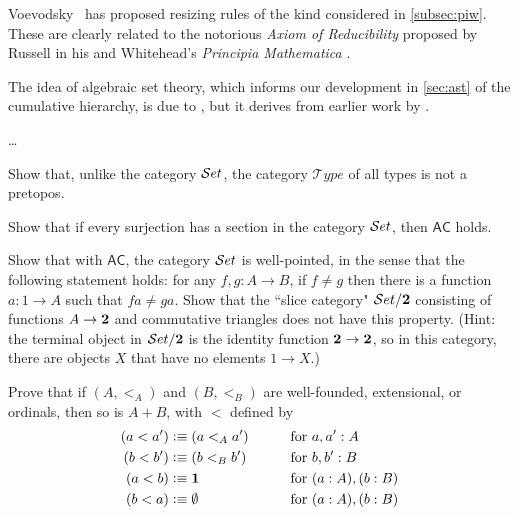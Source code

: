 Voevodsky~\cite{Universe-poly} has proposed resizing rules of the kind considered in \autoref{subsec:piw}.  These are clearly related to the notorious \emph{Axiom of Reducibility} proposed by Russell in his and Whitehead's \emph{Principia Mathematica} \cite{WR:PM}.

The idea of algebraic set theory, which informs our development in \autoref{sec:ast} of the cumulative hierarchy, is due to \cite{JoyalMoerdijk}, but it derives from earlier work by \cite{AczelCZF}.

\dots

\sectionExercises

\begin{ex}
  Show that, unlike  the category $\mathcal{S}et$, the category $\mathcal{T}ype$ of all types is not a pretopos.
  \end{ex}

\begin{ex}
  Show that if every surjection has a section in the category $\mathcal{S}et$, then $\mathsf{AC}$ holds.
\end{ex}

\begin{ex}
Show that with $\mathsf{AC}$, the category $\mathcal{S}et$ is well-pointed, in the sense that the following statement holds: for any $f, g : A\to B$, if $f \neq g$ then there is a function $a : 1\to A$ such that $fa \neq ga$.  Show that the ``slice category" $\mathcal{S}et/\mathbf{2}$ consisting of functions $A\to \mathbf{2}$ and commutative triangles does not have this property. (Hint: the terminal object in $\mathcal{S}et/\mathbf{2}$ is the identity function $\mathbf{2} \to \mathbf{2}$, so in this category, there are objects $X$ that have no elements $1\to X$.)
\end{ex}

\begin{ex}
  Prove that if $(A,<_A)$ and $(B,<_B)$ are well-founded, extensional, or ordinals, then so is $A+B$, with $<$ defined by
  \begin{alignat*}{2}
    (a<a') &\vcentcolon\equiv (a<_A a') &\qquad\text{for }& a,a':A\\
    (b<b') &\vcentcolon\equiv (b<_B b') &\qquad\text{for }& b,b':B\\
    (a<b) &\vcentcolon\equiv \mathbf{1} &\qquad\text{for }& (a:A),(b:B)\\
    (b<a) &\vcentcolon\equiv \emptyset &\qquad\text{for } &(a:A),(b:B)
  \end{alignat*}
\end{ex}

